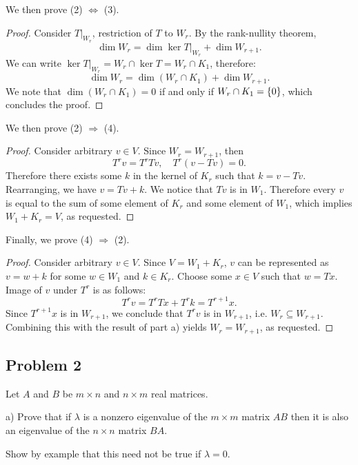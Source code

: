 \documentclass{article}
\theoremstyle{definition}
\DeclarePairedDelimiter\set{\{}{\}}
\newcommand{\restrict}[1]{ \big|_{#1} }
\begin{document}
We then prove (2) $\iff$ (3).

\begin{proof}
Consider $T\restrict{W_r}$, restriction of $T$ to $W_r$.
By the rank-nullity theorem,
\[ \dim W_{r} = \dim \ker T\restrict{W_r} + \dim W_{r+1}. \]
We can write $\ker T\restrict{W_r} = W_r \cap \ker T = W_r \cap K_1$, therefore:
\[ \dim W_{r} = \dim (W_r \cap K_1) + \dim W_{r+1}. \]
We note that $\dim (W_r \cap K_1) = 0$ if and only if $W_r \cap K_1 = \set{0}$, which concludes the proof.
\end{proof}

We then prove (2) $\Longrightarrow$ (4).

\begin{proof}
Consider arbitrary $v \in V$.
Since $W_r = W_{r+1}$, then
\[ T^r v = T^r Tv, \quad T^r (v - Tv) = 0. \]
Therefore there exists some $k$ in the kernel of $K_r$ such that $k = v-Tv$.
Rearranging, we have $v = Tv + k$.
We notice that $Tv$ is in $W_1$.
Therefore every $v$ is equal to the sum of some element of $K_r$ and some element of $W_1$, which implies $W_1 + K_r = V$, as requested.
\end{proof}

Finally, we prove (4) $\Longrightarrow$ (2).

\begin{proof}

Consider arbitrary $v \in V$.
Since $V = W_1 + K_r$, $v$ can be represented as $v = w+k$ for some $w \in W_1$ and $k \in K_r$.
Choose some $x \in V$ such that $w = Tx$.
Image of $v$ under $T^r$ is as follows:
\[ T^r v = T^r Tx + T^r k = T^{r+1} x. \]
Since $T^{r+1} x$ is in $W_{r+1}$, we conclude that $T^r v$ is in $W_{r+1}$, i.e. $W_r \subseteq W_{r+1}$.
Combining this with the result of part a) yields $W_r = W_{r+1}$, as requested.

\end{proof}


\subsection*{Problem 2}

\begin{tcolorbox}
Let $A$ and $B$ be $m \times n$ and $n \times m$ real matrices.

a) Prove that if $\lambda$ is a nonzero eigenvalue of the $m \times m$ matrix $AB$ then it is also an eigenvalue of the $n \times n$ matrix $BA$.

Show by example that this need not be true if $\lambda = 0$.
\end{tcolorbox}
\end{document}
